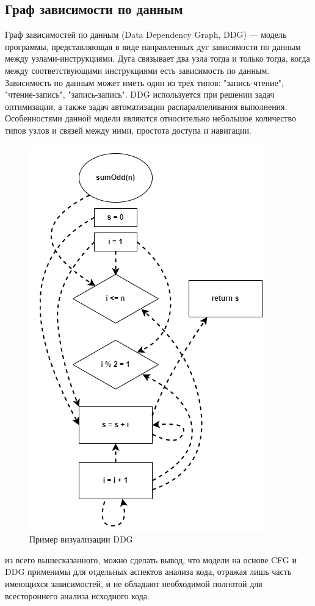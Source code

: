 \newpage
\subsection{Граф зависимости по данным} \label{ch1:subsec-title-abbr}
Граф зависимостей по данным (Data Dependency Graph, DDG) — модель программы, представляющая в виде направленных дуг зависимости по данным между узлами-инструкциями. Дуга связывает два узла тогда и только тогда, когда между соответствующими инструкциями есть зависимость по данным. Зависимость по данным может иметь один из трех типов: "запись-чтение", "чтение-запись", "запись-запись".
DDG используется при решении задач оптимизации, а также задач автоматизации распараллеливания выполнения. Особенностями данной модели являются относительно небольшое количество типов узлов и связей между ними, простота доступа и навигации.\\
\begin{figure}[h!]
	\center
	\includegraphics [scale=0.73] {my_folder/images/my/4}
	\caption{Пример визуализации DDG}
	\label{fig:4}  
\end{figure}
\hfill \break
{} из всего вышесказанного, можно сделать вывод, что модели на основе CFG и DDG применимы для отдельных аспектов анализа кода, отражая лишь часть имеющихся зависимостей, и не обладают необходимой полнотой для всестороннего анализа исходного кода.
\newpage
